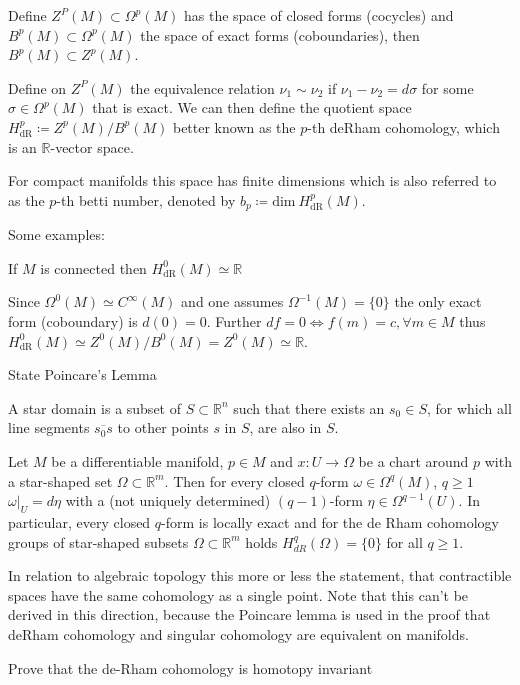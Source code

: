 Define \( Z^P(M) \subset \Omega^p(M) \) has the space of closed forms (cocycles)
and \( B^p(M) \subset \Omega^p(M) \) the space of exact forms (coboundaries),
then \( B^p(M) \subset Z^p(M) \).

Define on \( Z^P(M) \) the equivalence relation \( \nu_1 \sim \nu_2 \) if \( \nu_1 - \nu_2 = d\sigma \)
for some \( \sigma \in \Omega^p(M) \) that is exact. We can then define the quotient space
\( H^p_{\text{dR}} \coloneqq Z^p(M)/B^p(M) \)
better known as the \( p \)-th deRham cohomology, which is an \( \mathbb{R} \)-vector space.

For compact manifolds this space has finite dimensions which is also referred to as the \( p \)-th
betti number, denoted by \( b_p \coloneqq \text{dim}\ H^p_{\text{dR}}(M)\).

Some examples:

If \( M \) is connected then \( H^0_{\text{dR}}(M) \simeq \mathbb{R} \)

Since \( \Omega^0(M) \simeq C^\infty(M) \) and one assumes \( \Omega^{-1}(M) = \{0\} \)
the only exact form (coboundary) is \( d(0) = 0 \). Further \( df = 0 \iff f(m) = c, \forall m \in M \)
thus \( H^0_{\text{dR}}(M) \simeq Z^0(M) / B^0(M) = Z^0(M) \simeq \mathbb{R} \).


State Poincare's Lemma

A star domain is a subset of \( S \subset \mathbb{R}^n \) such that there exists an \( s_0 \in S \),
for which all line segments \( \overline{s_0s} \) to other points \( s \) in \( S \), are also in \( S \).

Let \(M\) be a differentiable manifold, \(p \in M\) and \(x: U \to \Omega\) be a chart around \(p\) 
with a star-shaped set \(\Omega \subset \mathbb{R}^m\). 
Then for every closed \(q\)-form \(\omega \in \Omega^q(M)\), \(q \geq 1\)
\(\omega|_U = d\eta\)
with a (not uniquely determined) \((q-1)\)-form \(\eta \in \Omega^{q-1}(U)\). 
In particular, every closed \(q\)-form is locally exact and for the de Rham cohomology groups 
of star-shaped subsets \(\Omega \subset \mathbb{R}^m\) holds \(H^q_{dR}(\Omega) = \{0\}\) for all \(q \geq 1\).

In relation to algebraic topology this more or less the statement, that contractible spaces have the same cohomology
as a single point. Note that this can't be derived in this direction, because the Poincare lemma is used in the proof
that deRham cohomology and singular cohomology are equivalent on manifolds.


Prove that the de-Rham cohomology is homotopy invariant

